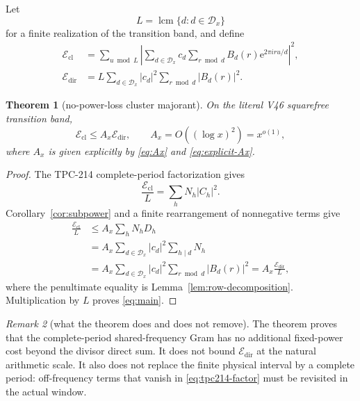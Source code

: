 \documentclass[11pt]{article}
\newtheorem{theorem}{Theorem}[section]
\theoremstyle{definition}
\theoremstyle{remark}
\newtheorem{remark}[theorem]{Remark}
\newcommand{\Dd}{\mathcal D}
\newcommand{\ee}{\mathrm e}
\newcommand{\Ecl}{\mathcal E_{\mathrm{cl}}}
\newcommand{\Edir}{\mathcal E_{\mathrm{dir}}}
\begin{document}
Let
\begin{equation}
 L=\operatorname{lcm}\{d:d\in\Dd_x\}
 \label{eq:period}
\end{equation}
for a finite realization of the transition band, and define
\begin{align}
 \Ecl
 &=\sum_{u\bmod L}\left|
   \sum_{d\in\Dd_x}c_d\sum_{r\bmod d}
   B_d(r)\ee^{2\pi iru/d}\right|^2,
 \label{eq:cluster-energy}\\
 \Edir
 &=L\sum_{d\in\Dd_x}|c_d|^2
   \sum_{r\bmod d}|B_d(r)|^2.
 \label{eq:direct-energy}
\end{align}

\begin{theorem}[no-power-loss cluster majorant]
\label{thm:main}
On the literal V46 squarefree transition band,
\begin{equation}
 \boxed{\Ecl\le A_x\Edir},
 \qquad A_x=O((\log x)^2)=x^{o(1)},
 \label{eq:main}
\end{equation}
where $A_x$ is given explicitly by \eqref{eq:Ax} and
\eqref{eq:explicit-Ax}.
\end{theorem}

\begin{proof}
The TPC-214 complete-period factorization gives
\begin{equation}
 \frac{\Ecl}{L}=\sum_hN_h|C_h|^2.
 \label{eq:tpc214-factor}
\end{equation}
Corollary~\ref{cor:subpower} and a finite rearrangement of nonnegative terms
give
\begin{align}
 \frac{\Ecl}{L}
 &\le A_x\sum_hN_hD_h \\
 &=A_x\sum_{d\in\Dd_x}|c_d|^2\sum_{h\mid d}N_h \\
 &=A_x\sum_{d\in\Dd_x}|c_d|^2
       \sum_{r\bmod d}|B_d(r)|^2
 =A_x\frac{\Edir}{L},
\end{align}
where the penultimate equality is Lemma~\ref{lem:row-decomposition}.
Multiplication by $L$ proves \eqref{eq:main}.
\end{proof}

\begin{remark}[what the theorem does and does not remove]
The theorem proves that the complete-period shared-frequency Gram has no
additional fixed-power cost beyond the divisor direct sum.  It does not bound
\(\Edir\) at the natural arithmetic scale.  It also does not replace the
finite physical interval by a complete period: off-frequency terms that
vanish in \eqref{eq:tpc214-factor} must be revisited in the actual window.
\end{remark}
\end{document}
